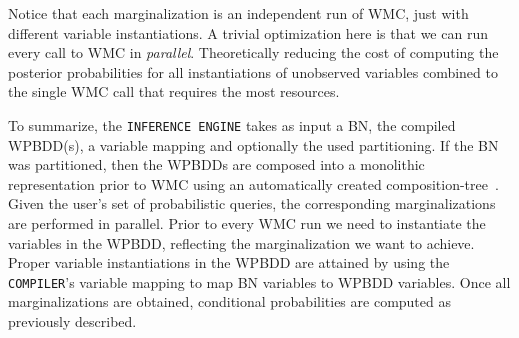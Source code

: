 Notice that each marginalization is an independent run of WMC, just with different variable instantiations. A trivial optimization here is that we can run every call to WMC in \emph{parallel}. Theoretically reducing the cost of computing the posterior probabilities for all instantiations of unobserved variables combined to the single WMC call that requires the most resources.



To summarize, the \texttt{INFERENCE ENGINE} takes as input a BN, the compiled WPBDD(s), a variable mapping and optionally the used partitioning. If the BN was partitioned, then the WPBDDs are composed into a monolithic representation prior to WMC using an automatically created composition-tree~\cite{dal2021compositional}. Given the user's set of probabilistic queries, the corresponding marginalizations are performed in parallel. Prior to every WMC run we need to instantiate the variables in the WPBDD, reflecting the marginalization we want to achieve. Proper variable instantiations in the WPBDD are attained by using the \texttt{COMPILER}'s variable mapping to map BN variables to WPBDD variables. Once all marginalizations are obtained, conditional probabilities are computed as previously described.



